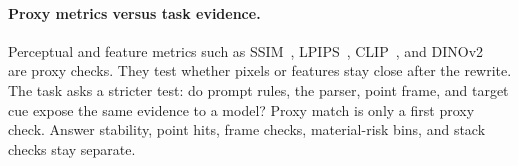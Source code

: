 \paragraph{Proxy metrics versus task evidence.}
Perceptual and feature metrics such as SSIM~\cite{Wang2004Image},
LPIPS~\cite{Zhang2018Unreasonable}, CLIP~\cite{Radford2021Learning}, and
DINOv2~\cite{Oquab2023DINOv2} are proxy checks. They test whether pixels or
features stay close after the rewrite. The task asks a stricter test: do prompt
rules, the parser, point frame, and target cue expose the same evidence to a
model? Proxy match is only a first proxy check. Answer stability, point hits,
frame checks, material-risk bins, and stack checks stay separate.
